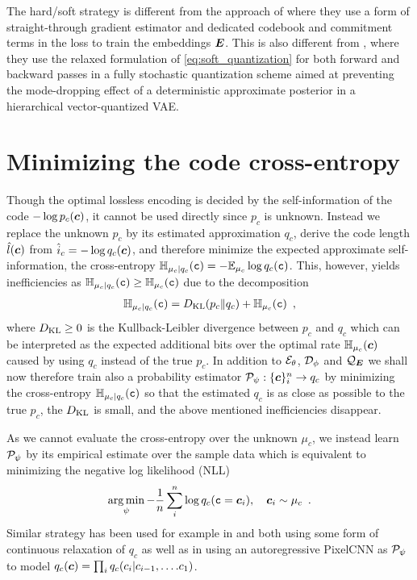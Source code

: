 \documentclass{article} %
\renewcommand{\rvc}{\mathtt{c}}
\newcommand{\pc}{p_c}
\newcommand{\qc}{q_c}
\newcommand{\muc}{\mu_c}
\newcommand{\Hc}{\sH_{\muc}}
\newcommand{\cHc}{\sH_{\muc|\qc}}
\newcommand{\gEt}{\gE_\theta}
\newcommand{\gQE}{\gQ_\mE}
\newcommand{\gDp}{\gD_\phi}
\newcommand{\gPp}{\gP_{\psi}}
\begin{document}
The hard/soft strategy is different from the approach of \citet{oordNeuralDiscreteRepresentation2017} where they use a form of straight-through gradient estimator and dedicated codebook and commitment terms in the loss to train the embeddings ${\bm{E}}$.
This is also different from \citet{williamsHierarchicalQuantizedAutoencoders2020}, where they use the relaxed formulation of \eqref{eq:soft_quantization} for both forward and backward passes in a fully stochastic quantization scheme aimed at preventing the mode-dropping effect of a deterministic approximate posterior in a hierarchical vector-quantized VAE.


\section{Minimizing the code cross-entropy}

Though the optimal lossless encoding is decided by the self-information of the code $-\log \pc(\vc)$, it cannot be used directly since $\pc$ is unknown.
Instead we replace the unknown $\pc$ by its estimated approximation
$\qc$, derive the code length $\hat{l}({\bm{c}})$ from $\hat{i}_c = - \log \qc(\vc)$, and therefore minimize the expected approximate self-information, the cross-entropy $\cHc(\rvc) = - \E_{\muc} \log \qc(\rvc)$.
This, however, yields inefficiencies as $\cHc(\rvc) \geq \Hc(\rvc)$ due to the decomposition
\begin{align}\label{eq:crossentropy_KL}
\cHc(\rvc) = \KL(\pc \Vert \qc) + \Hc(\rvc) \enspace ,
\end{align}
where $D_{\mathrm{KL}} \geq 0$ is the Kullback-Leibler divergence between $\pc$ and $\qc$ which can be interpreted as the expected additional bits over the optimal rate $\Hc(\vc)$ caused by using $\qc$ instead of the true $\pc$.
In addition to $\gEt$, $\gDp$ and $\gQE$ we shall now therefore train also a probability estimator $\gPp : \{\vc\}_i^n \to \qc$ by minimizing the cross-entropy $\cHc(\rvc)$ so that the estimated $\qc$ is as close as possible to the true $\pc$, the $D_{\mathrm{KL}}$ is small, and the above mentioned inefficiencies disappear.

As we cannot evaluate the cross-entropy over the unknown $\muc$, we instead learn $\gPp$ by its empirical estimate over the sample data which is equivalent to minimizing the negative log likelihood (NLL)
\begin{align}\label{eq:empirical_crossentropy}
\argmin_\psi - \frac{1}{n}\sum_i^n \log \qc(\rvc = \vc_i), \quad \vc_i \sim \muc \enspace .
\end{align}
Similar strategy has been used for example in \citet{theisLossyImageCompression2017} and \citet{balleEndtoendOptimizedImage2017} both using some form of continuous relaxation of $\qc$ as well as in \citet{mentzerConditionalProbabilityModels2018} using an autoregressive PixelCNN as $\gPp$ to model $\qc(\vc) = \prod_i \qc(\evc_i | \evc_{i-1}, \ldots. \evc_1)$.
\end{document}
